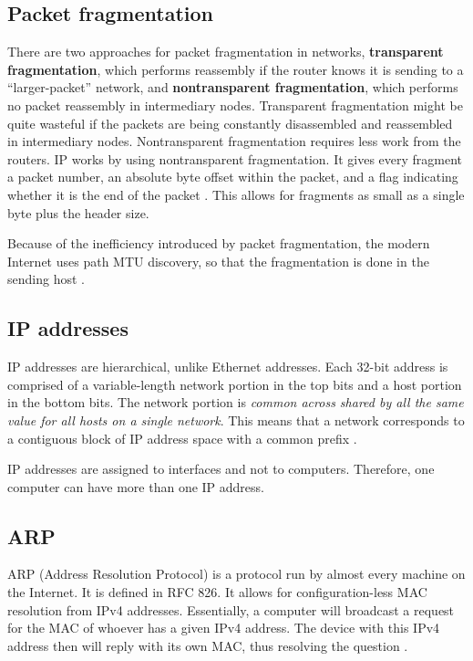 \subsection{Packet fragmentation}\label{Packet fragmentation}

There are two approaches for packet fragmentation in networks, \textbf{transparent fragmentation}, which performs reassembly if the router knows it is sending to a ``larger-packet'' network, and \textbf{nontransparent fragmentation}, which performs no packet reassembly in intermediary nodes.
Transparent fragmentation might be quite wasteful if the packets are being constantly disassembled and reassembled in intermediary nodes.
Nontransparent fragmentation requires less work from the routers.
IP works by using nontransparent fragmentation.
It gives every fragment a packet number, an absolute byte offset within the packet, and a flag indicating whether it is the end of the packet \cite[p.~434]{computer-networks-tanenbaum-2012}. This allows for fragments as small as a single byte plus the header size.

Because of the inefficiency introduced by packet fragmentation, the modern Internet uses path MTU discovery, so that the fragmentation is done in the sending host \cite[p.~435]{computer-networks-tanenbaum-2012}.

\subsection{IP addresses}

IP addresses are hierarchical, unlike Ethernet addresses. Each 32-bit address is comprised of a variable-length network portion in the top bits and a host portion in the bottom bits.
The network portion is \emph{common across shared by all the same value for all hosts on a single network}.
This means that a network corresponds to a contiguous block of IP address space with a common prefix \cite{computer-networks-tanenbaum-2012}.

IP addresses are assigned to interfaces and not to computers.
Therefore, one computer can have more than one IP address.

\subsection{ARP}

ARP (Address Resolution Protocol) is a protocol run by almost every machine on the Internet. It is defined in RFC
826. It allows for configuration-less MAC resolution from IPv4 addresses. Essentially, a computer will broadcast a request for the MAC of whoever has a given IPv4 address. The device with this IPv4 address then will reply with its own MAC, thus resolving the question \cite{computer-networks-tanenbaum-2012}.

